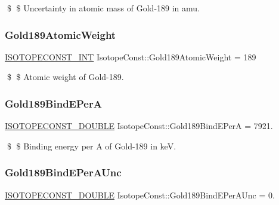 \$ \$ Uncertainty in atomic mass of Gold-\/189 in amu. \mbox{\label{group___isotope_const-_gold-_au189_ga30e16791d895a615cbacadacdf54fc28}} 
\subsubsection{\texorpdfstring{Gold189\+Atomic\+Weight}{Gold189AtomicWeight}}
{\footnotesize\ttfamily \mbox{\hyperlink{group___isotope_const-_macros_ga5f18360b3e99483a35c32d789e62621c}{I\+S\+O\+T\+O\+P\+E\+C\+O\+N\+S\+T\+\_\+\+I\+NT}} Isotope\+Const\+::\+Gold189\+Atomic\+Weight = 189}

\$ \$ Atomic weight of Gold-\/189. \mbox{\label{group___isotope_const-_gold-_au189_ga2e48ce7e8389cd2b6e9bbc4b29b95156}} 
\subsubsection{\texorpdfstring{Gold189\+Bind\+E\+PerA}{Gold189BindEPerA}}
{\footnotesize\ttfamily \mbox{\hyperlink{group___isotope_const-_macros_ga8f45a7272ce02c0b4c65c44636ed719a}{I\+S\+O\+T\+O\+P\+E\+C\+O\+N\+S\+T\+\_\+\+D\+O\+U\+B\+LE}} Isotope\+Const\+::\+Gold189\+Bind\+E\+PerA = 7921.}

\$ \$ Binding energy per A of Gold-\/189 in keV. \mbox{\label{group___isotope_const-_gold-_au189_gae165682d87958aec2707d20d886dcfab}} 
\subsubsection{\texorpdfstring{Gold189\+Bind\+E\+Per\+A\+Unc}{Gold189BindEPerAUnc}}
{\footnotesize\ttfamily \mbox{\hyperlink{group___isotope_const-_macros_ga8f45a7272ce02c0b4c65c44636ed719a}{I\+S\+O\+T\+O\+P\+E\+C\+O\+N\+S\+T\+\_\+\+D\+O\+U\+B\+LE}} Isotope\+Const\+::\+Gold189\+Bind\+E\+Per\+A\+Unc = 0.}

